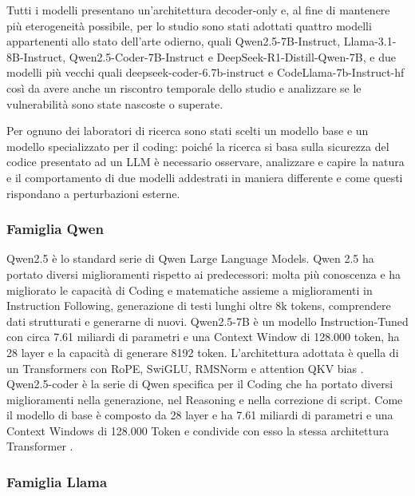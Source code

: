 Tutti i modelli presentano un'architettura decoder-only e, al fine di mantenere più eterogeneità possibile, per lo studio sono stati adottati quattro modelli appartenenti allo stato dell'arte odierno, quali Qwen2.5-7B-Instruct, Llama-3.1-8B-Instruct, Qwen2.5-Coder-7B-Instruct e DeepSeek-R1-Distill-Qwen-7B, e due modelli più vecchi quali deepseek-coder-6.7b-instruct e CodeLlama-7b-Instruct-hf così da avere anche un riscontro temporale dello studio e analizzare se le vulnerabilità sono state nascoste o superate.

Per ognuno dei laboratori di ricerca sono stati scelti un modello base e un modello specializzato per il coding: poiché la ricerca si basa sulla sicurezza del codice presentato ad un LLM è necessario osservare, analizzare e capire la natura e il comportamento di due modelli addestrati in maniera differente e come questi rispondano a perturbazioni esterne.

\subsubsection{Famiglia Qwen}

Qwen2.5 è lo standard serie di Qwen Large Language Models. Qwen 2.5 ha portato diversi miglioramenti rispetto ai predecessori: molta più conoscenza e ha migliorato le capacità di Coding e matematiche assieme a miglioramenti in Instruction Following, generazione di testi lunghi oltre 8k tokens, comprendere dati strutturati e generarne di nuovi.
Qwen2.5-7B è un modello Instruction-Tuned con circa 7.61 miliardi di parametri e una Context Window di 128.000 token, ha 28 layer e la capacità di generare 8192 token.
L'architettura adottata è quella di un Transformers con RoPE, SwiGLU, RMSNorm e attention QKV bias \cite{qwen2.5-hf}.
Qwen2.5-coder è la serie di Qwen specifica per il Coding che ha portato diversi miglioramenti nella generazione, nel Reasoning e nella correzione di script.
Come il modello di base è composto da 28 layer e ha 7.61 miliardi di parametri e una Context Windows di 128.000 Token e condivide con esso la stessa architettura Transformer \cite{hui2024qwen2-coder-hf}.

\subsubsection{Famiglia Llama}

